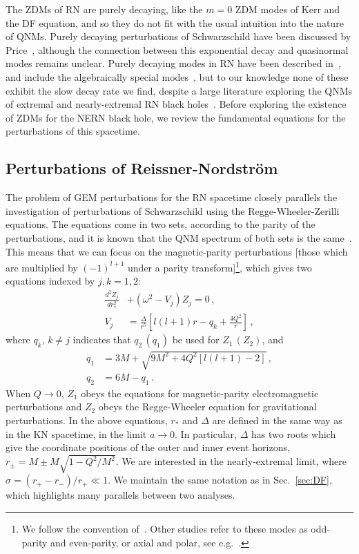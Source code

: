 \begin{refsection}
The ZDMs of RN are purely decaying, like the $m=0$ ZDM modes of Kerr and the DF equation, and so they do not fit with the usual intuition into the nature of QNMs. 
Purely decaying perturbations of Schwarzschild have been discussed by Price~\cite{Price:1971fb,Price:1972pw,wheeler1972magic}, although the connection between this exponential decay and quasinormal modes remains unclear.
Purely decaying modes in RN have been described in~\cite{Andersson:1996xw,Andersson:2003fh}, and include the algebraically special modes~\cite{Chandra:1984a}, but to our knowledge none of these exhibit the slow decay rate we find, despite a large literature exploring the QNMs of extremal and nearly-extremal RN black holes~\cite{LeaverRN,Onozawa:1995vu,Berti2009}.
Before exploring the existence of ZDMs for the NERN black hole, we review the fundamental equations for the perturbations of this spacetime.

\subsection{Perturbations of Reissner-Nordstr\"{o}m}

The problem of GEM perturbations for the RN spacetime closely parallels the investigation of perturbations of Schwarzschild using the Regge-Wheeler-Zerilli equations. 
The equations come in two sets, according to the parity of the perturbations, and it is known that the QNM spectrum of both sets is the same~\cite{ChandraBook,Dias:2015wqa}. 
This means that we can focus on the magnetic-parity perturbations [those which are multiplied by $(-1)^{l+1}$ under a parity transform]\footnote{We follow the convention of~\cite{Zerilli:1970wd}. Other studies refer to these modes as odd-parity and even-parity, or axial and polar, see e.g.~\cite{Pani:2013ija,Pani:2013wsa}.}, which gives two equations indexed by $j,k = 1,2$:
\begin{align}
\label{eq:RNwave}
\frac{d^2 Z_j}{dr_*^2}& + (\omega^2 - V_j) Z_j = 0 \,, \\
\label{eq:RNpot}
V_j & = \frac{\Delta}{r^5}\left[ l(l+1) r - q_k +\frac{4 Q^2}{r} \right] \,,
\end{align}
where $q_k$, $k \neq j$ indicates that $q_2\, (q_1)$ be used for $Z_1\, (Z_2)$, and
\begin{align}
q_1 &= 3 M  + \sqrt{9 M^2 +4 Q^2 [l(l+1)-2]} \,, \\
q_2 & = 6M - q_1 \,.
\end{align}
When $Q \to 0$, $Z_1$ obeys the equations for  magnetic-parity electromagnetic perturbations and $Z_2$ obeys the Regge-Wheeler equation for gravitational perturbations. In the above equations, $r_*$ and $\Delta$ are defined in the same way as in the KN spacetime, in the limit $a \to 0$. In particular, $\Delta$ has two roots which give the coordinate positions of the outer and inner event horizons, $r_\pm = M \pm M \sqrt{1 - Q^2/M^2}$.
We are interested in the nearly-extremal limit, where $\sigma = (r_+ - r_-)/r_+ \ll 1$. We maintain the same notation as in Sec.~\ref{sec:DF}, which highlights many parallels between two analyses.


\end{refsection}
